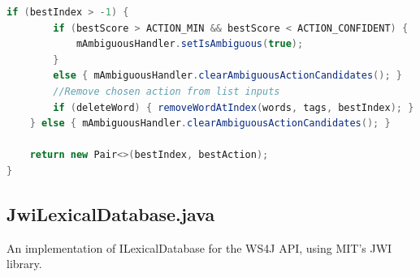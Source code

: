\documentclass[11pt]{article}
\begin{document}
\begin{lstlisting}[language=Java, caption=MainActivity.getBestAction()]
    if (bestIndex > -1) {
        if (bestScore > ACTION_MIN && bestScore < ACTION_CONFIDENT) {
            mAmbiguousHandler.setIsAmbiguous(true);
        }
        else { mAmbiguousHandler.clearAmbiguousActionCandidates(); }
        //Remove chosen action from list inputs
        if (deleteWord) { removeWordAtIndex(words, tags, bestIndex); }
    } else { mAmbiguousHandler.clearAmbiguousActionCandidates(); }

    return new Pair<>(bestIndex, bestAction);
}
\end{lstlisting}

\newpage
\subsection{JwiLexicalDatabase.java}
\label{appendix:customLexDB}

An implementation of ILexicalDatabase for the WS4J API, using MIT's JWI library.
\end{document}

